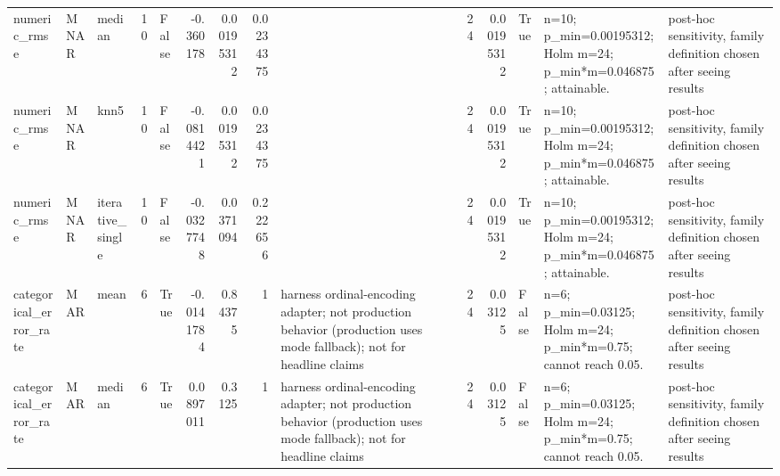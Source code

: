 \begin{table}[ht]
\begin{tabular}{lllrlrrrlrrlll}
 numeric\_rmse           & MNAR        & median           &           10 & False               &      -0.360178   & 0.00195312 & 0.0234375 &                                                                                                                    &                             24 &                         0.00195312 & True                        & n=10; p\_min=0.00195312; Holm m=24; p\_min*m=0.046875; attainable. & post-hoc sensitivity, family definition chosen after seeing results \\
 numeric\_rmse           & MNAR        & knn5             &           10 & False               &      -0.0814421  & 0.00195312 & 0.0234375 &                                                                                                                    &                             24 &                         0.00195312 & True                        & n=10; p\_min=0.00195312; Holm m=24; p\_min*m=0.046875; attainable. & post-hoc sensitivity, family definition chosen after seeing results \\
 numeric\_rmse           & MNAR        & iterative\_single &           10 & False               &      -0.0327748  & 0.0371094  & 0.222656  &                                                                                                                    &                             24 &                         0.00195312 & True                        & n=10; p\_min=0.00195312; Holm m=24; p\_min*m=0.046875; attainable. & post-hoc sensitivity, family definition chosen after seeing results \\
 categorical\_error\_rate & MAR         & mean             &            6 & True                &      -0.0141784  & 0.84375    & 1         & harness ordinal-encoding adapter; not production behavior (production uses mode fallback); not for headline claims &                             24 &                         0.03125    & False                       & n=6; p\_min=0.03125; Holm m=24; p\_min*m=0.75; cannot reach 0.05.  & post-hoc sensitivity, family definition chosen after seeing results \\
 categorical\_error\_rate & MAR         & median           &            6 & True                &       0.0897011  & 0.3125     & 1         & harness ordinal-encoding adapter; not production behavior (production uses mode fallback); not for headline claims &                             24 &                         0.03125    & False                       & n=6; p\_min=0.03125; Holm m=24; p\_min*m=0.75; cannot reach 0.05.  & post-hoc sensitivity, family definition chosen after seeing results \\

\end{tabular}
\end{table}
